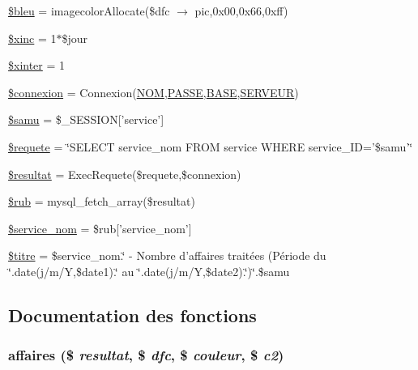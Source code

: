 \begin{CompactItemize}
\hyperlink{graphe__veille__samu_8php_a19}{\$bleu} = imagecolor\-Allocate(\$dfc $\rightarrow$ pic,0x00,0x66,0xff)
\item 
\hyperlink{graphe__veille__samu_8php_a20}{\$xinc} = 1$\ast$\$jour
\item 
\hyperlink{graphe__veille__samu_8php_a21}{\$xinter} = 1
\item 
\hyperlink{graphe__veille__samu_8php_a22}{\$connexion} = Connexion(\hyperlink{pma__connect_8php_a0}{NOM},\hyperlink{pma__connect_8php_a1}{PASSE},\hyperlink{pma__connect_8php_a3}{BASE},\hyperlink{pma__connect_8php_a2}{SERVEUR})
\item 
\hyperlink{graphe__veille__samu_8php_a23}{\$samu} = \$\_\-SESSION\mbox{[}'service'\mbox{]}
\item 
\hyperlink{graphe__veille__samu_8php_a24}{\$requete} = \char`\"{}SELECT service\_\-nom FROM service WHERE service\_\-ID='\$samu'\char`\"{}
\item 
\hyperlink{graphe__veille__samu_8php_a25}{\$resultat} = Exec\-Requete(\$requete,\$connexion)
\item 
\hyperlink{graphe__veille__samu_8php_a26}{\$rub} = mysql\_\-fetch\_\-array(\$resultat)
\item 
\hyperlink{graphe__veille__samu_8php_a27}{\$service\_\-nom} = \$rub\mbox{[}'service\_\-nom'\mbox{]}
\item 
\hyperlink{graphe__veille__samu_8php_a28}{\$titre} = \$service\_\-nom.\char`\"{} - Nombre d'affaires trait\'{e}es (P\'{e}riode du \char`\"{}.date(j/m/Y,\$date1).\char`\"{} au \char`\"{}.date(j/m/Y,\$date2).\char`\"{})\char`\"{}.\$samu
\end{CompactItemize}


\subsection{Documentation des fonctions}
\hypertarget{graphe__veille__samu_8php_a29}{
\subsubsection[affaires]{\setlength{\rightskip}{0pt plus 5cm}affaires (\$ {\em resultat}, \$ {\em dfc}, \$ {\em couleur}, \$ {\em c2})}}
\label{graphe__veille__samu_8php_a29}



